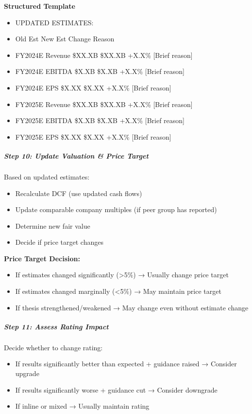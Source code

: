 \documentclass[11pt]{article}
\begin{document}
\textbf{Structured Template}
\begin{itemize}[leftmargin=*,itemsep=2pt,topsep=2pt]
\item {} UPDATED ESTIMATES:
\item {} Old Est New Est Change Reason
\item {} FY2024E Revenue \$XX.XB \$XX.XB +X.X\% [Brief reason]
\item {} FY2024E EBITDA \$X.XB \$X.XB +X.X\% [Brief reason]
\item {} FY2024E EPS \$X.XX \$X.XX +X.X\% [Brief reason]
\item {} FY2025E Revenue \$XX.XB \$XX.XB +X.X\% [Brief reason]
\item {} FY2025E EBITDA \$X.XB \$X.XB +X.X\% [Brief reason]
\item {} FY2025E EPS \$X.XX \$X.XX +X.X\% [Brief reason]
\end{itemize}

\subparagraph{Step 10: Update Valuation \& Price Target}\mbox{}\par

Based on updated estimates:

\begin{itemize}[leftmargin=*,itemsep=2pt,topsep=2pt]
\item {} Recalculate DCF (use updated cash flows)
\item {} Update comparable company multiples (if peer group has reported)
\item {} Determine new fair value
\item {} Decide if price target changes
\end{itemize}

\textbf{Price Target Decision:}

\begin{itemize}[leftmargin=*,itemsep=2pt,topsep=2pt]
\item {} If estimates changed significantly (>5\%) → Usually change price target
\item {} If estimates changed marginally (<5\%) → May maintain price target
\item {} If thesis strengthened/weakened → May change even without estimate change
\end{itemize}

\subparagraph{Step 11: Assess Rating Impact}\mbox{}\par

Decide whether to change rating:

\begin{itemize}[leftmargin=*,itemsep=2pt,topsep=2pt]
\item {} If results significantly better than expected + guidance raised → Consider upgrade
\item {} If results significantly worse + guidance cut → Consider downgrade
\item {} If inline or mixed → Usually maintain rating
\end{itemize}
\end{document}
